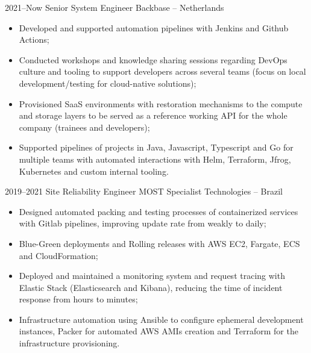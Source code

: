\documentclass[a4paper]{cv-friggeri-x}
\begin{document}
\begin{entrylist}


\entry
    {2021--Now}
    {Senior System Engineer}
    {Backbase -- Netherlands}
    {\begin{itemize}
        \item Developed and supported automation pipelines with Jenkins and Github Actions;
        \item Conducted workshops and knowledge sharing sessions regarding DevOps culture and tooling to support developers across several teams (focus on local development/testing for cloud-native solutions);
        \item Provisioned SaaS environments with restoration mechanisms to the compute and storage layers to be served as a reference working API for the whole company (trainees and developers);
        \item Supported pipelines of projects in Java, Javascript, Typescript and Go for multiple teams with automated interactions with Helm, Terraform, Jfrog, Kubernetes and custom internal tooling.
    \end{itemize}}

\entry
    {2019--2021}
    {Site Reliability Engineer}
    {MOST Specialist Technologies -- Brazil}
    {\begin{itemize}
        \item Designed automated packing and testing processes of containerized services with Gitlab pipelines, improving update rate from weakly to daily;
        \item Blue-Green deployments and Rolling releases with AWS EC2, Fargate, ECS and CloudFormation;
        \item Deployed and maintained a monitoring system and request tracing with Elastic Stack (Elasticsearch and Kibana), reducing the time of incident response from hours to minutes;
        \item Infrastructure automation using Ansible to configure ephemeral development instances, Packer for automated AWS AMIs creation and Terraform for the infrastructure provisioning.
    \end{itemize}}


\end{entrylist}
\end{document}
